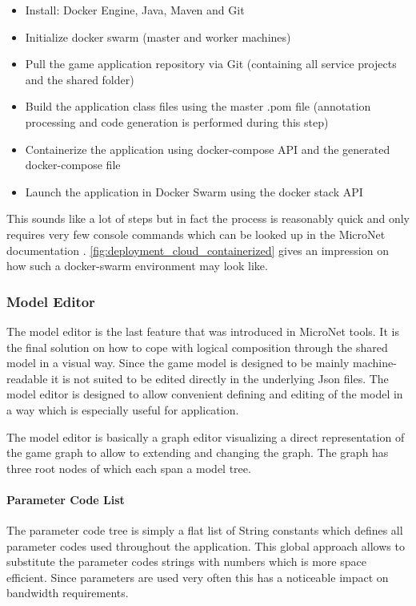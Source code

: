\begin{itemize}
  \item Install: Docker Engine, Java, Maven and Git
  \item Initialize docker swarm (master and worker machines)
  \item Pull the game application repository via Git (containing all service
  projects and the shared folder)
  \item Build the application class files using the master .pom file (annotation
  processing and code generation is performed during this step)
  \item Containerize the application using docker-compose API and the generated
  docker-compose file
  \item Launch the application in Docker Swarm using the docker stack API 
\end{itemize}

This sounds like a lot of steps but in fact the process is reasonably quick and
only requires very few console commands which can be looked up in the MicroNet
documentation \cite{micronet2017doku}.
\autoref{fig:deployment_cloud_containerized} gives an impression on how such a
docker-swarm environment may look like.

\subsubsection{Model Editor}

The model editor is the last feature that was introduced in MicroNet tools. It
is the final solution on how to cope with logical \ms{} composition through the
shared model in a visual way. Since the game model is designed to be mainly
machine-readable it is not suited to be edited directly in the underlying Json
files. The model editor is designed to allow convenient defining and editing of
the model in a way which is especially useful for \og{} application.

The model editor is basically a graph editor visualizing a direct representation
of the game graph to allow to extending and changing the graph. The graph has
three root nodes of which each span a model tree.

\paragraph{Parameter Code List}

The parameter code tree is simply a flat list of String constants which defines
all parameter codes used throughout the application. This global approach allows
to substitute the parameter codes strings with numbers which is more space
efficient. Since parameters are used very often this has a noticeable impact on
bandwidth requirements.

